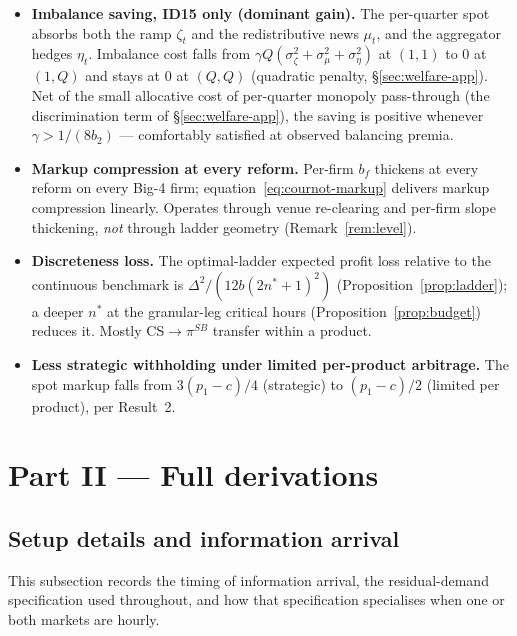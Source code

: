 \documentclass[11pt,a4paper]{article}
\theoremstyle{definition}
\theoremstyle{remark}
\theoremstyle{plain}
\begin{document}
\begin{itemize}\setlength{\itemsep}{1pt}
  \item \textbf{Imbalance saving, ID15 only (dominant gain).} The per-quarter spot absorbs both the ramp $\zeta_t$ and the redistributive news $\mu_t$, and the aggregator hedges $\eta_t$. Imbalance cost falls from $\gamma Q(\sigma_\zeta^2+\sigma_\mu^2+\sigma_\eta^2)$ at $(1,1)$ to $0$ at $(1,Q)$ and stays at $0$ at $(Q,Q)$ (quadratic penalty, \S\ref{sec:welfare-app}). Net of the small allocative cost of per-quarter monopoly pass-through (the discrimination term of \S\ref{sec:welfare-app}), the saving is positive whenever $\gamma > 1/(8 b_2)$ --- comfortably satisfied at observed balancing premia.
  \item \textbf{Markup compression at every reform.} Per-firm $b_f$ thickens at every reform on every Big-4 firm; equation~\eqref{eq:cournot-markup} delivers markup compression linearly. Operates through venue re-clearing and per-firm slope thickening, \emph{not} through ladder geometry (Remark~\ref{rem:level}).
  \item \textbf{Discreteness loss.} The optimal-ladder expected profit loss relative to the continuous benchmark is $\Delta^2/(12 b (2 n^* + 1)^2)$ (Proposition~\ref{prop:ladder}); a deeper $n^*$ at the granular-leg critical hours (Proposition~\ref{prop:budget}) reduces it. Mostly CS$\to\pi^{SB}$ transfer within a product.
  \item \textbf{Less strategic withholding under limited per-product arbitrage.} The spot markup falls from $3(p_1-c)/4$ (strategic) to $(p_1-c)/2$ (limited per product), per \citeauthor{ito_reguant_2016} Result~2.
\end{itemize}

\clearpage
\section{Part II --- Full derivations}\label{sec:deriv}

\subsection{Setup details and information arrival}\label{sec:setup-app}

This subsection records the timing of information arrival, the \citeauthor{ito_reguant_2016} residual-demand specification used throughout, and how that specification specialises when one or both markets are hourly.
\end{document}

